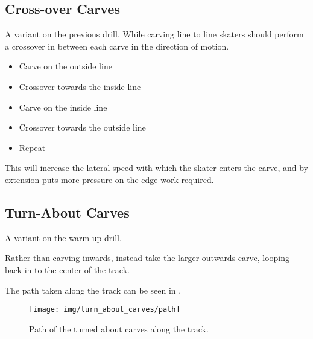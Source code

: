 \subsection*{Cross-over Carves}

A variant on the previous drill. 
While carving line to line skaters should perform a crossover in between each carve in the direction of motion.

\begin{itemize}
    \item Carve on the outside line
    \item Crossover towards the inside line 
    \item Carve on the inside line
    \item Crossover towards the outside line
    \item Repeat 
\end{itemize}

This will increase the lateral speed with which the skater enters the carve, and by extension puts more pressure on the edge-work required.      

\subsection*{Turn-About Carves}

A variant on the warm up drill.

Rather than carving inwards, instead take the larger outwards carve, looping back in to the center of the track. 

The path taken along the track can be seen in . 

\begin{figure*}
\centering
\texttt{[image: img/turn\_about\_carves/path]}
\caption{Path of the turned about carves along the track. \label{fig:sticky/carves/turn_about}}
\end{figure*}
